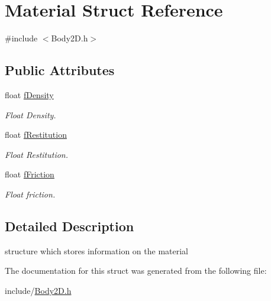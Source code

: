 \hypertarget{struct_material}{\section{Material Struct Reference}
\label{struct_material}
}


{\ttfamily \#include $<$Body2\+D.\+h$>$}

\subsection*{Public Attributes}
\begin{DoxyCompactItemize}
\item 
\hypertarget{struct_material_ab3ed6198749e068421eb6ca9142bf66d}{float \hyperlink{struct_material_ab3ed6198749e068421eb6ca9142bf66d}{f\+Density}}\label{struct_material_ab3ed6198749e068421eb6ca9142bf66d}

\begin{DoxyCompactList}\small\item\em Float Density. \end{DoxyCompactList}\item 
\hypertarget{struct_material_a1a2b4a0a84de4e6e9bc8f52847453e5c}{float \hyperlink{struct_material_a1a2b4a0a84de4e6e9bc8f52847453e5c}{f\+Restitution}}\label{struct_material_a1a2b4a0a84de4e6e9bc8f52847453e5c}

\begin{DoxyCompactList}\small\item\em Float Restitution. \end{DoxyCompactList}\item 
\hypertarget{struct_material_a48fcaa790747f9402d48017cae285a98}{float \hyperlink{struct_material_a48fcaa790747f9402d48017cae285a98}{f\+Friction}}\label{struct_material_a48fcaa790747f9402d48017cae285a98}

\begin{DoxyCompactList}\small\item\em Float friction. \end{DoxyCompactList}\end{DoxyCompactItemize}


\subsection{Detailed Description}
structure which stores information on the material 

The documentation for this struct was generated from the following file\+:\begin{DoxyCompactItemize}
\item 
include/\hyperlink{_body2_d_8h}{Body2\+D.\+h}\end{DoxyCompactItemize}
